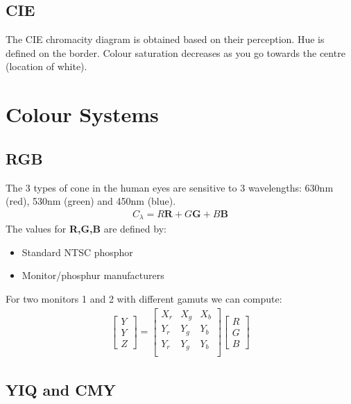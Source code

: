 \documentclass{article}
\begin{document}
\subsection{CIE}
The CIE chromacity diagram is obtained based on their perception.
Hue is defined on the  border.
Colour saturation decreases as you go towards the centre (location of white).

\section{Colour Systems}
\subsection{RGB}
The 3 types of cone in the human eyes are sensitive to 3 wavelengths: 630nm (red), 530nm (green) and 450nm (blue).
\begin{align*}
	C_\lambda = R\textbf{R} + G\textbf{G} + B\textbf{B}
\end{align*}
The values for \textbf{R,G,B} are defined by:
\begin{itemize}
	\item Standard NTSC phosphor
	\item Monitor/phosphur manufacturers
\end{itemize}
For two monitors 1 and 2 with different gamuts we can compute:
\begin{align*}
	\begin{bmatrix}
		Y \\ Y \\ Z
	\end{bmatrix}
	=
	\begin{bmatrix}
		X_r & X_g & X_b \\
		Y_r & Y_g & Y_b \\
		Y_r & Y_g & Y_b \\
	\end{bmatrix}
	\begin{bmatrix}
		R \\ G \\ B
	\end{bmatrix}
\end{align*}

\subsection{YIQ and CMY}
\end{document}
